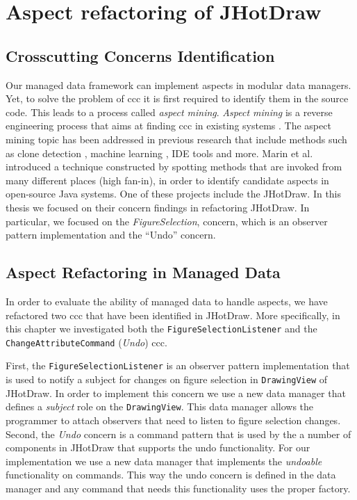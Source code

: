 
\chapter{Aspect refactoring of JHotDraw}\label{AspectRefactoring}

\section{Crosscutting Concerns Identification}
Our managed data framework can implement aspects in modular data managers.
Yet, to solve the problem of \ac{ccc} it is first required to identify them in the source code.
This leads to a process called \textit{aspect mining}.
\textit{Aspect mining} is a reverse engineering process that aims at finding \ac{ccc} in existing systems \cite{marin2004identifying}.
The aspect mining topic has been addressed in previous research that include methods such as clone detection \cite{bruntink2005use}, machine learning \cite{shepherd2004design}, IDE tools \cite{robillard2002concern} and more. 
Marin et al. \cite{marin2004identifying} introduced a technique constructed by spotting methods that are invoked from many different places (high fan-in), in order to identify candidate aspects in open-source Java systems.
One of these projects include the JHotDraw.
In this thesis we focused on their concern findings in refactoring JHotDraw.
In particular, we focused on the \textit{FigureSelection}, concern, which is an observer pattern implementation and the ``Undo'' concern.

\section{Aspect Refactoring in Managed Data}
In order to evaluate the ability of managed data to handle aspects, we have refactored two \ac{ccc} that have been identified in JHotDraw.
More specifically, in this chapter we investigated both the \texttt{FigureSelectionListener} and the \texttt{ChangeAttributeCommand} (\textit{Undo}) \ac{ccc}.

First, the \texttt{FigureSelectionListener} is an observer pattern implementation that is used to notify a subject for changes on figure selection in \texttt{DrawingView} of JHotDraw.
In order to implement this concern we use a new data manager that defines a \textit{subject} role on the \texttt{DrawingView}. 
This data manager allows the programmer to attach observers that need to listen to figure selection changes.
Second, the \textit{Undo} concern is a command pattern that is used by the a number of components in JHotDraw that supports the undo functionality.
For our implementation we use a new data manager that implements the \textit{undoable} functionality on commands.
This way the undo concern is defined in the data manager and any command that needs this functionality uses the proper factory.


